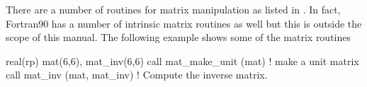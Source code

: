 There are a number of \bmad routines for matrix manipulation as listed
in . In fact, Fortran90 has a number of intrinsic matrix
routines as well but this is outside the scope of this manual. The
following example shows some of the \bmad matrix routines
\begin{example}
  real(rp) mat(6,6), mat_inv(6,6)
  call mat_make_unit (mat)    ! make a unit matrix
  call mat_inv (mat, mat_inv) ! Compute the inverse matrix.
\end{example}